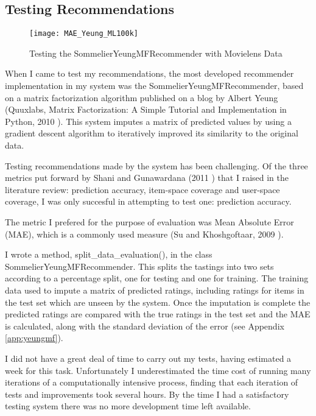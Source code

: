 \subsection{Testing Recommendations}

\begin{figure}[h!]
    \caption{Testing the SommelierYeungMFRecommender with Movielens Data}
    \centering
        \texttt{[image: MAE\_Yeung\_ML100k]}
    \label{fig:movielenstest}
\end{figure}

When I came to test my recommendations, the most developed recommender implementation in my system was the SommelierYeungMFRecommender, based on a matrix factorization algorithm published on a blog by Albert Yeung (Quuxlabs, Matrix Factorization: A Simple Tutorial and Implementation in Python, 2010 \cite{Yeung10}). This system imputes a matrix of predicted values by using a gradient descent algorithm to iteratively improved its similarity to the original data.

Testing recommendations made by the system has been challenging. Of the three metrics put forward by Shani and Gunawardana (2011 \cite{Shani11}) that I raised in the literature review: prediction accuracy, item-space coverage and user-space coverage, I was only succesful in attempting to test one: prediction accuracy.

The metric I prefered for the purpose of evaluation was Mean Absolute Error (MAE), which is a commonly used measure (Su and Khoshgoftaar, 2009 \cite{Su09}).

I wrote a method, split\_data\_evaluation(), in the class SommelierYeungMFRecommender. This splits the tastings into two sets according to a percentage split, one for testing and one for training. The training data used to impute a matrix of predicted ratings, including ratings for items in the test set which are unseen by the system. Once the imputation is complete the predicted ratings are compared with the true ratings in the test set and the MAE is calculated, along with the standard deviation of the error (see Appendix \ref{app:yeungmf}).

I did not have a great deal of time to carry out my tests, having estimated a week for this task. Unfortunately I underestimated the time cost of running many iterations of a computationally intensive process, finding that each iteration of tests and improvements took several hours. By the time I had a satisfactory testing system there was no more development time left available.

